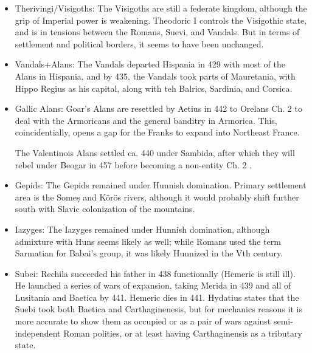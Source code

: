 \documentclass{article}
\newcommand{\specificCite}[1]{\tiny #1 \normalsize}
\begin{document}
\begin{itemize}
		\item Therivingi/Visigoths:\newline
		The Visigoths are still a federate kingdom, although the grip of Imperial power is weakening.
		Theodoric I controls the Visigothic state, and is in tensions between the Romans, Suevi, and Vandals.
		But in terms of settlement and political borders, it seems to have been unchanged.
		
		\item Vandals+Alans:\newline
		The Vandals departed Hispania in 429 with most of the Alans in Hispania, and by 435, the Vandals took parts of Mauretania, with Hippo Regius as his capital, along with teh Balrics, Sardinia, and Corsica. 
		
		\item Gallic Alans:\newline
		Goar's Alans are resettled by Aetius in 442 to Orelans \cite{BachrachAlans}\specificCite{Ch. 2} to deal with the Armoricans and the general banditry in Armorica.
		This, coincidentially, opens a gap for the Franks to expand into Northeast France.
		
		The Valentinois Alans settled ca. 440 under Sambida, after which they will rebel under Beogar in 457 before becoming a non-entity \cite{BachrachAlans}\specificCite{Ch. 2}.
		
		\item Gepids:\newline
		The Gepids remained under Hunnish domination.
		Primary settlement area is the Someș and Körös rivers, although it would probably shift further south with Slavic colonization of the mountains.
		
		\item Iazyges:\newline
		The Iazyges remained under Hunnish domination, although admixture with Huns seems likely as well; while Romans used the term Sarmatian for Babai's group, it was likely Hunnized in the Vth century.
		
		\item Subei:\newline
		Rechila succeeded his father in 438 functionally (Hemeric is still ill).
		He launched a series of wars of expansion, taking Merida in 439 and all of Lusitania and Baetica by 441.
		Hemeric dies in 441.
		Hydatius states that the Suebi took both Baetica and Carthaginenesis, but for mechanics reasons it is more accurate to show them as occupied or as a pair of wars against semi-independent Roman polities, or at least having Carthaginensis as a tributary state.
		

\end{itemize}
\end{document}
